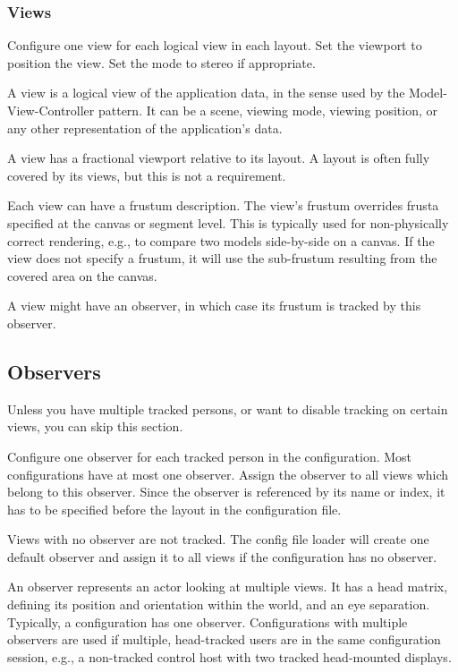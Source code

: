 \documentclass[10pt,a4]{scrartcl}
\begin{document}
\subsubsection{Views}

Configure one \textsf{view} for each logical view in each layout. Set the
\textsf{viewport} to position the view. Set the mode to stereo if appropriate.

A view is a logical view of the application data, in the sense used by
the Model-View-Controller pattern. It can be a scene, viewing mode,
viewing position, or any other representation of the application's data.

A view has a fractional viewport relative to its layout.  A layout
is often fully covered by its views, but this is not a requirement.

Each view can have a frustum description. The view's frustum overrides
frusta specified at the canvas or segment level. This is typically used
for non-physically correct rendering, e.g., to compare two models
side-by-side on a canvas. If the view does not specify a frustum, it
will use the sub-frustum resulting from the covered area on the canvas.

A view might have an observer, in which case its frustum is tracked by
this observer. 

\subsection{Observers}

Unless you have multiple tracked persons, or want to disable tracking on
certain views, you can skip this section.

Configure one \textsf{observer} for each tracked person in the
configuration. Most configurations have at most one observer. Assign the
observer to all views which belong to this observer. Since the observer
is referenced by its name or index, it has to be specified before the
layout in the configuration file.

Views with no observer are not tracked. The config file loader will
create one default observer and assign it to all views if the
configuration has no observer.

An observer represents an actor looking at multiple views. It has a head
matrix, defining its position and orientation within the world, and an
eye separation. Typically, a configuration has one
observer. Configurations with multiple observers are used if multiple,
head-tracked users are in the same configuration session, e.g., a
non-tracked control host with two tracked head-mounted displays.
\end{document}
